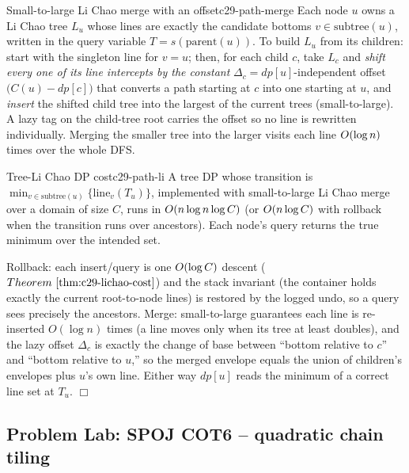 \begin{definition}{Small-to-large Li Chao merge with an offset}{c29-path-merge}
Each node \(u\) owns a Li Chao tree \(L_u\) whose lines are exactly the
candidate bottoms \(v\in\text{subtree}(u)\), written in the query variable
\(T=s(\text{parent}(u))\).  To build \(L_u\) from its children: start with the
singleton line for \(v=u\); then, for each child \(c\), take \(L_c\) and
\emph{shift every one of its line intercepts by the constant}
\(\Delta_c = \mathit{dp}[u]\)-independent offset \(\big(C(u)-\mathit{dp}[c]\big)\)
that converts a path starting at \(c\) into one starting at \(u\), and
\emph{insert} the shifted child tree into the largest of the current trees
(small-to-large).  A lazy  tag on the child-tree root carries the
offset so no line is rewritten individually.  Merging the smaller tree into the
larger visits each line \(O(\log n)\) times over the whole DFS.
\end{definition}

\begin{theorem}{Tree-Li Chao DP cost}{c29-path-li}
A tree DP whose transition is \(\min_{v\in\text{subtree}(u)}\{\text{line}_v(T_u)\}\),
implemented with small-to-large Li Chao merge over a domain of size \(C\), runs
in \(O(n\log n\log C)\) (or \(O(n\log C)\) with rollback when the
transition runs over ancestors).  Each node's query returns the true minimum
over the intended set.
\end{theorem}
\begin{proofbox}
Rollback: each insert/query is one \(O(\log C)\) descent
(\(\thmref{c29-lichao-cost}\)) and the stack invariant (the container holds
exactly the current root-to-node lines) is restored by the logged undo, so a
query sees precisely the ancestors.  Merge: small-to-large guarantees each line
is re-inserted \(O(\log n)\) times (a line moves only when its tree at least
doubles), and the lazy offset \(\Delta_c\) is exactly the change of base
between ``bottom relative to \(c\)'' and ``bottom relative to \(u\),'' so the
merged envelope equals the union of children's envelopes plus \(u\)'s own line.
Either way \(\mathit{dp}[u]\) reads the minimum of a correct line set at
\(T_u\). \(\Box\)
\end{proofbox}

\subsection{Problem Lab: SPOJ COT6 -- quadratic chain tiling}

